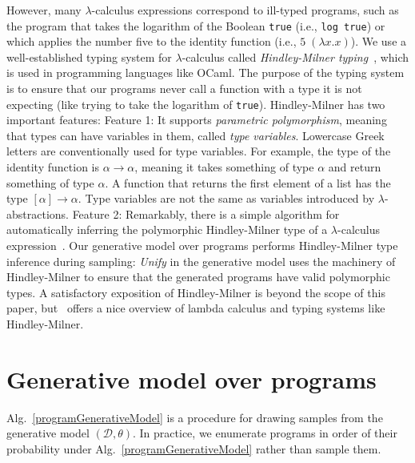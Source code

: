 \documentclass{article}
\begin{document}
However, many $\lambda$-calculus expressions correspond to ill-typed programs, such as the program that takes the logarithm of the Boolean \texttt{true} (i.e., \texttt{log true}) or which applies the number five to the identity function
(i.e., $5 \; (\lambda x.x)$).
We use a well-established typing system for $\lambda$-calculus called \emph{Hindley-Milner typing}~\cite{pierce}, which is used in programming languages like OCaml.
The purpose of the typing system is to ensure that our programs never call a function with a type it is not expecting (like trying to take the logarithm of \texttt{true}).
Hindley-Milner has two important features:
Feature 1: It supports \emph{parametric polymorphism}, meaning that types can have variables in them, called \emph{type variables}. Lowercase Greek letters are conventionally used for  type variables.
For example, the type of the identity function is $\alpha\to\alpha$, meaning it takes something of type $\alpha$ and return something of type $\alpha$. A function that returns the first element of a list has the type $[\alpha]\to\alpha$. Type variables are not the same as variables introduced by $\lambda$-abstractions.
Feature 2: Remarkably, there is a  simple algorithm for automatically inferring the polymorphic Hindley-Milner type of a $\lambda$-calculus expression~\cite{damas1982principal}.
Our generative model over programs performs Hindley-Milner type inference during sampling:
\emph{Unify} in the generative model uses the machinery of Hindley-Milner to
ensure that the generated programs have valid polymorphic types.
A satisfactory exposition of Hindley-Milner is beyond the scope of this paper,
but~\cite{pierce} offers a nice overview of lambda calculus and typing systems like Hindley-Milner.


\vfill
\section{Generative model over programs}

Alg.~\ref{programGenerativeModel} is a procedure for drawing
samples from the generative model $(\mathcal{D},\theta)$.  In practice, we
enumerate programs in order of their probability under  Alg.~\ref{programGenerativeModel} rather than sample them.
\end{document}
